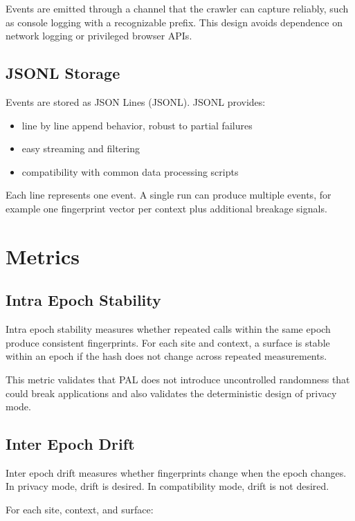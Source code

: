 \documentclass[11pt]{report}
\begin{document}
Events are emitted through a channel that the crawler can capture reliably, such as console logging with a recognizable prefix. This design avoids dependence on network logging or privileged browser APIs.

\subsection{JSONL Storage}

Events are stored as JSON Lines (JSONL). JSONL provides:

\begin{itemize}
    \item line by line append behavior, robust to partial failures
    \item easy streaming and filtering
    \item compatibility with common data processing scripts
\end{itemize}

Each line represents one event. A single run can produce multiple events, for example one fingerprint vector per context plus additional breakage signals.

\section{Metrics}

\subsection{Intra Epoch Stability}

Intra epoch stability measures whether repeated calls within the same epoch produce consistent fingerprints. For each site and context, a surface is stable within an epoch if the hash does not change across repeated measurements.

This metric validates that PAL does not introduce uncontrolled randomness that could break applications and also validates the deterministic design of privacy mode.

\subsection{Inter Epoch Drift}

Inter epoch drift measures whether fingerprints change when the epoch changes. In privacy mode, drift is desired. In compatibility mode, drift is not desired.

For each site, context, and surface:
\end{document}
